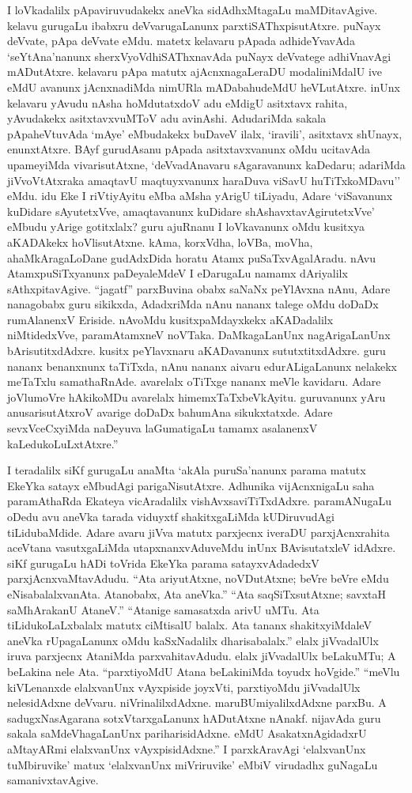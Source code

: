 I loVkadalilx pApaviruvudakekx aneVka sidAdhxMtagaLu maMDitavAgive. kelavu gurugaLu ibabxru deVvarugaLanunx parxtiSAThxpisutAtxre. puNayx deVvate, pApa deVvate eMdu. matetx kelavaru pApada adhideYvavAda `seYtAna'nanunx sherxVyoVdhiSAThxnavAda puNayx deVvatege adhiVnavAgi mADutAtxre. kelavaru pApa matutx ajAcnxnagaLeraDU modaliniMdalU ive eMdU avanunx jAcnxnadiMda nimURla mADabahudeMdU heVLutAtxre. inUnx kelavaru yAvudu nAsha hoMdutatxdoV adu eMdigU asitxtavx rahita, yAvudakekx asitxtavxvuMToV adu avinAshi. AdudariMda sakala pApaheVtuvAda `mAye' eMbudakekx buDaveV ilalx, `iravili', asitxtavx shUnayx, enunxtAtxre. BAyf gurudAsanu pApada asitxtavxvanunx oMdu ucitavAda upameyiMda vivarisutAtxne, `deVvadAnavaru sAgaravanunx kaDedaru; adariMda jiVvoVtAtxraka amaqtavU maqtuyxvanunx haraDuva viSavU huTiTxkoMDavu'' eMdu. idu Eke I riVtiyAyitu eMba aMsha yArigU tiLiyadu, Adare `viSavanunx kuDidare sAyutetxVve, amaqtavanunx kuDidare shAshavxtavAgirutetxVve' eMbudu yArige gotitxlalx? guru ajuRnanu I loVkavanunx oMdu kusitxya aKADAkekx hoVlisutAtxne. kAma, korxVdha, loVBa, moVha, ahaMkAragaLoDane gudAdxDida horatu Atamx puSaTxvAgalAradu. nAvu AtamxpuSiTxyanunx paDeyaleMdeV I eDarugaLu namamx dAriyalilx sAthxpitavAgive. ``jagatf'' parxBuvina obabx saNaNx peYlAvxna nAnu, Adare nanagobabx guru sikikxda, AdadxriMda nAnu nananx talege oMdu doDaDx rumAlanenxV Eriside. nAvoMdu kusitxpaMdayxkekx aKADadalilx niMtidedxVve, paramAtamxneV noVTaka. DaMkagaLanUnx nagArigaLanUnx bArisutitxdAdxre. kusitx peYlavxnaru aKADavanunx sututxtitxdAdxre. guru nananx benanxnunx taTiTxda, nAnu nananx aivaru edurALigaLanunx nelakekx meTaTxlu samathaRnAde. avarelalx oTiTxge nananx meVle kavidaru. Adare joVlumoVre hAkikoMDu avarelalx himemxTaTxbeVkAyitu. guruvanunx yAru anusarisutAtxroV avarige doDaDx bahumAna sikukxtatxde. Adare sevxVceCxyiMda naDeyuva laGumatigaLu tamamx asalanenxV kaLedukoLuLxtAtxre.''

I teradalilx siKf gurugaLu anaMta `akAla puruSa'nanunx parama matutx EkeYka satayx eMbudAgi parigaNisutAtxre. Adhunika vijAcnxnigaLu saha paramAthaRda Ekateya vicAradalilx vishAvxsaviTiTxdAdxre. paramANugaLu oDedu avu aneVka tarada viduyxtf shakitxgaLiMda kUDiruvudAgi tiLidubaMdide. Adare avaru jiVva matutx parxjecnx iveraDU parxjAcnxrahita aceVtana vasutxgaLiMda utapxnanxvAduveMdu inUnx BAvisutatxleV idAdxre. siKf gurugaLu hADi toVrida EkeYka parama satayxvAdadedxV parxjAcnxvaMtavAdudu. ``Ata ariyutAtxne, noVDutAtxne; beVre beVre eMdu eNisabalalxvanAta. Atanobabx, Ata aneVka.'' ``Ata saqSiTxsutAtxne; savxtaH saMhArakanU AtaneV.'' ``Atanige samasatxda arivU uMTu. Ata tiLidukoLaLxbalalx matutx ciMtisalU balalx. Ata tananx shakitxyiMdaleV aneVka rUpagaLanunx oMdu kaSxNadalilx dharisabalalx.'' elalx jiVvadalUlx iruva parxjecnx AtaniMda parxvahitavAdudu. elalx jiVvadalUlx beLakuMTu; A beLakina nele Ata. ``parxtiyoMdU Atana beLakiniMda toyudx hoVgide.'' ``meVlu kiVLenanxde elalxvanUnx vAyxpiside joyxVti, parxtiyoMdu jiVvadalUlx nelesidAdxne deVvaru. niVrinalilxdAdxne. maruBUmiyalilxdAdxne parxBu. A sadugxNasAgarana sotxVtarxgaLanunx hADutAtxne nAnakf. nijavAda guru sakala saMdeVhagaLanUnx pariharisidAdxne. eMdU AsakatxnAgidadxrU aMtayARmi elalxvanUnx vAyxpisidAdxne.'' I parxkAravAgi `elalxvanUnx tuMbiruvike' matux `elalxvanUnx miVriruvike' eMbiV virudadhx guNagaLu samanivxtavAgive.

